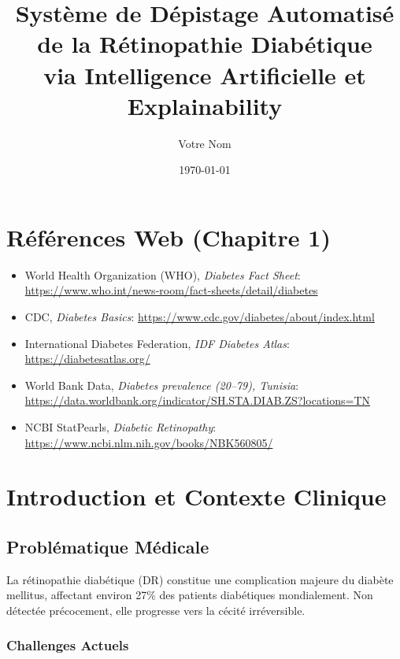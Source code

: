 \documentclass[12pt,a4paper,oneside]{report}
\title{\LARGE \textbf{Système de Dépistage Automatisé de la Rétinopathie Diabétique\\
        via Intelligence Artificielle et Explainability}}
\author{Votre Nom}
\date{\today}
\begin{document}
\maketitle

\tableofcontents

\newpage
\chapter*{Références Web (Chapitre 1)}
\begin{itemize}
    \item World Health Organization (WHO), \textit{Diabetes Fact Sheet}: \url{https://www.who.int/news-room/fact-sheets/detail/diabetes}
    \item CDC, \textit{Diabetes Basics}: \url{https://www.cdc.gov/diabetes/about/index.html}
    \item International Diabetes Federation, \textit{IDF Diabetes Atlas}: \url{https://diabetesatlas.org/}
    \item World Bank Data, \textit{Diabetes prevalence (20--79), Tunisia}: \url{https://data.worldbank.org/indicator/SH.STA.DIAB.ZS?locations=TN}
    \item NCBI StatPearls, \textit{Diabetic Retinopathy}: \url{https://www.ncbi.nlm.nih.gov/books/NBK560805/}
\end{itemize}

\newpage


\chapter{Introduction et Contexte Clinique}

\section{Problématique Médicale}

La rétinopathie diabétique (DR) constitue une complication majeure du 
diabète mellitus, affectant environ 27\% des patients diabétiques 
mondialement. Non détectée précocement, elle progresse vers la cécité 
irréversible.

\subsection{Challenges Actuels}
\end{document}
